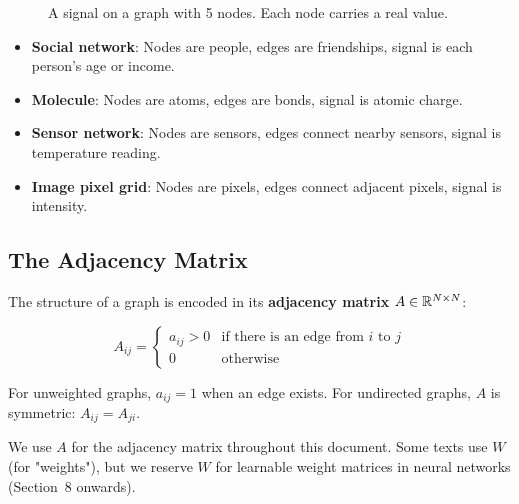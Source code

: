 \begin{notechapter}
\begin{figure}[H]
\caption{A signal on a graph with 5 nodes. Each node carries a real 
         value.}
\end{figure}

\begin{example}
\begin{itemize}
\item \textbf{Social network}: Nodes are people, edges are friendships, 
      signal is each person's age or income.
\item \textbf{Molecule}: Nodes are atoms, edges are bonds, signal is 
      atomic charge.
\item \textbf{Sensor network}: Nodes are sensors, edges connect nearby 
      sensors, signal is temperature reading.
\item \textbf{Image pixel grid}: Nodes are pixels, edges connect 
      adjacent pixels, signal is intensity.
\end{itemize}
\end{example}

\subsection{The Adjacency Matrix}

The structure of a graph is encoded in its \textbf{adjacency matrix} 
$A \in \mathbb{R}^{N \times N}$:

\begin{equation}
A_{ij} = \begin{cases}
a_{ij} > 0 & \text{if there is an edge from } i \text{ to } j \\
0 & \text{otherwise}
\end{cases}
\end{equation}

For unweighted graphs, $a_{ij} = 1$ when an edge exists. For undirected 
graphs, $A$ is symmetric: $A_{ij} = A_{ji}$.

\begin{remark}[Notation]
We use $A$ for the adjacency matrix throughout this document. Some 
texts use $W$ (for "weights"), but we reserve $W$ for learnable weight 
matrices in neural networks (Section~8 onwards).
\end{remark}


\end{notechapter}
